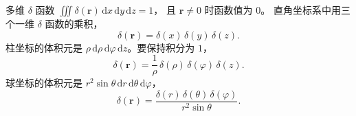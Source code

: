 \documentclass[fontset=windows, chinese, 10pt, xcolor=dvipsnames]{beamer}
\begin{document}
\begin{frame}{多维 $\delta$ 函数}
  $\displaystyle\iiint\delta(\mathbf{r})\,\mathrm{d}x\,\mathrm{d}y\,\mathrm{d}z=1$，
  且 $\mathbf{r}\neq 0$ 时函数值为 $0$。
  直角坐标系中用三个一维 $\delta$ 函数的乘积，
  \begin{equation*}
    \delta(\mathbf{r})=\delta(x)\,\delta(y)\,\delta(z).
  \end{equation*}
  柱坐标的体积元是 $\rho\,\mathrm{d}\rho\,\mathrm{d}\varphi\,\mathrm{d}z$。要保持积分为 $1$，
  \begin{equation*}
    \delta(\mathbf{r})
    =\frac{1}{\rho}\,\delta(\rho)\,\delta(\varphi)\,\delta(z).
  \end{equation*}
  球坐标的体积元是 $r^2\sin\theta\,\mathrm{d}r\,\mathrm{d}\theta\,\mathrm{d}\varphi$，
  \begin{equation*}
    \delta(\mathbf{r})
    =\frac{\delta(r)\,\delta(\theta)\,\delta(\varphi)}{r^2\sin\theta}.
  \end{equation*}
\end{frame}




\end{document}
